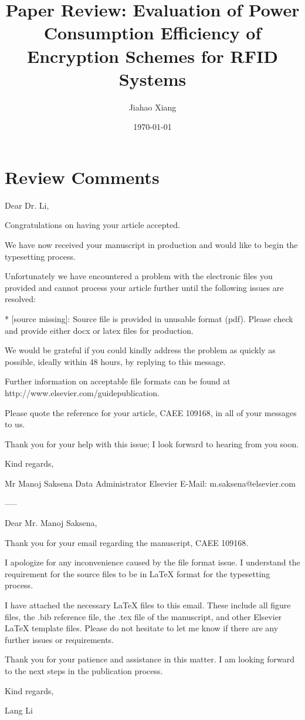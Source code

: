 \documentclass{article}
\title{Paper Review: Evaluation of Power Consumption Efficiency of Encryption Schemes for RFID Systems}
\author{Jiahao Xiang}
\date{\today}
\begin{document}
\maketitle

\section{Review Comments}

Dear Dr. Li,

Congratulations on having your article accepted. 

We have now received your manuscript in production and would like to begin the typesetting process.

Unfortunately we have encountered a problem with the electronic files you provided and cannot process your article further until the following issues are resolved:

*  [source missing]: Source file is provided in unusable format (pdf). Please check and provide either docx or latex files for production.

We would be grateful if you could kindly address the problem as quickly as possible, ideally within 48 hours, by replying to this message.

Further information on acceptable file formats can be found at http://www.elsevier.com/guidepublication.

Please quote the reference for your article, CAEE 109168, in all of your messages to us.  

Thank you for your help with this issue; I look forward to hearing from you soon.

Kind regards,

Mr Manoj Saksena
Data Administrator
Elsevier
E-Mail: m.saksena@elsevier.com

-----

Dear Mr. Manoj Saksena,

Thank you for your email regarding the manuscript, CAEE 109168.

I apologize for any inconvenience caused by the file format issue. I understand the requirement for the source files to be in LaTeX format for the typesetting process.

I have attached the necessary LaTeX files to this email. These include all figure files, the .bib reference file, the .tex file of the manuscript, and other Elsevier LaTeX template files. Please do not hesitate to let me know if there are any further issues or requirements.

Thank you for your patience and assistance in this matter. I am looking forward to the next steps in the publication process.

Kind regards,

Lang Li


\end{document}
